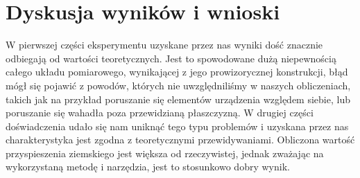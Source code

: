 \documentclass{article}
\begin{document}
\clearpage
\section{Dyskusja wyników i wnioski}
W pierwszej części eksperymentu uzyskane przez nas wyniki dość znacznie odbiegają od wartości teoretycznych. Jest to spowodowane dużą niepewnością całego układu pomiarowego, wynikającej z jego prowizorycznej konstrukcji, błąd mógł się pojawić z powodów, których nie uwzględniliśmy w naszych obliczeniach, takich jak na przykład poruszanie się elementów urządzenia względem siebie, lub poruszanie się wahadła poza przewidzianą płaszczyzną. W drugiej części doświadczenia udało się nam uniknąć tego typu problemów i uzyskana przez nas charakterystyka jest zgodna z teoretycznymi przewidywaniami. Obliczona wartość przyspieszenia ziemskiego jest większa od rzeczywistej, jednak zważając na wykorzystaną metodę i narzędzia, jest to stosunkowo dobry wynik.
\end{document}
